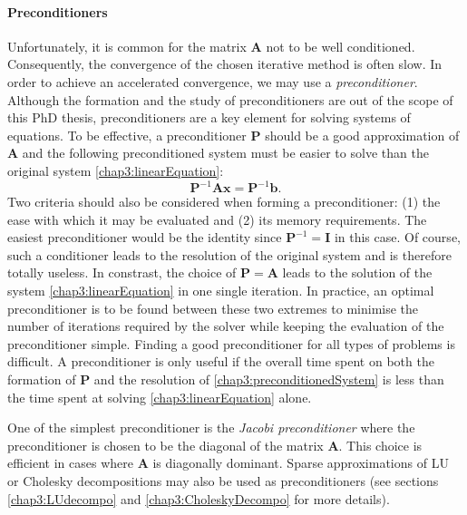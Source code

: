 \paragraph*{Preconditioners}
Unfortunately, it is common for the matrix $ \mathbf{A} $ not to be well conditioned. Consequently, the convergence of the chosen iterative method is often slow. In order to achieve an accelerated convergence, we may use a \emph{preconditioner}. Although the formation and the study of preconditioners are out of the scope of this PhD thesis, preconditioners are a key element for solving systems of equations. To be effective, a preconditioner $ \mathbf{P} $ should be a good approximation of  $ \mathbf{A} $ and the following preconditioned system must be easier to solve than the original system \eqref{chap3:linearEquation}:
\begin{equation}
\label{chap3:preconditionedSystem}
\mathbf{P}^{-1} \mathbf{A} \mathbf{x} = \mathbf{P}^{-1} \mathbf{b}.
\end{equation}
Two criteria should also be considered when forming a preconditioner: (1) the ease with which it may be evaluated and (2) its memory requirements. The easiest preconditioner would be the identity since $ \mathbf{P}^{-1} = \mathbf{I} $ in this case. Of course, such a conditioner leads to the resolution of the original system and is therefore totally useless. In constrast, the choice of $ \mathbf{P} = \mathbf{A} $ leads to the solution of the system \eqref{chap3:linearEquation} in one single iteration. In practice, an optimal preconditioner is to be found between these two extremes to minimise the number of iterations required by the solver while keeping the evaluation of the preconditioner simple. Finding a good preconditioner for all types of problems is difficult. A preconditioner is only useful if the overall time spent on both the formation of  $ \mathbf{P} $ and the resolution of \eqref{chap3:preconditionedSystem} is less than the time spent at solving \eqref{chap3:linearEquation} alone. 

One of the simplest preconditioner is the \emph{Jacobi preconditioner} where the preconditioner is chosen to be the diagonal of the matrix $ \mathbf{A} $. This choice is efficient in cases where $ \mathbf{A} $ is diagonally dominant. Sparse approximations of LU or Cholesky decompositions may also be used as preconditioners (see sections \ref{chap3:LUdecompo} and \ref{chap3:CholeskyDecompo} for more details). 
\OFF
